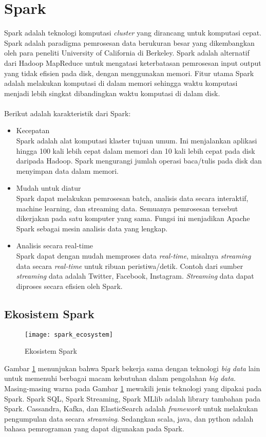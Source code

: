 \newpage
\section{Spark} 
\label{sec:konsep_spark}
Spark adalah teknologi komputasi \textit{cluster} yang dirancang untuk komputasi cepat. Spark adalah paradigma pemrosesan data berukuran besar yang dikembangkan oleh para peneliti University of California di Berkeley. Spark adalah alternatif dari Hadoop MapReduce untuk mengatasi keterbatasan pemrosesan input output yang tidak efisien pada disk, dengan menggunakan memori. Fitur utama Spark adalah melakukan komputasi di dalam memori sehingga waktu komputasi menjadi lebih singkat dibandingkan waktu komputasi di dalam disk.
\\\\
Berikut adalah karakteristik dari Spark:
\begin{itemize}
\item Kecepatan\\
Spark adalah alat komputasi klaster tujuan umum. Ini menjalankan aplikasi hingga 100 kali lebih cepat dalam memori dan 10 kali lebih cepat pada disk daripada Hadoop. Spark mengurangi jumlah operasi baca/tulis pada disk dan menyimpan data dalam memori.


\item Mudah untuk diatur\\	
Spark dapat melakukan pemrosesan batch, analisis data secara interaktif, machine learning, dan streaming data. Semuanya pemrosesan tersebut dikerjakan pada satu komputer yang sama. Fungsi ini menjadikan Apache Spark sebagai mesin analisis data yang lengkap. 


\item Analisis secara real-time\\
Spark dapat dengan mudah memproses data \textit{real-time}, misalnya \textit{streaming} data secara \textit{real-time} untuk ribuan peristiwa/detik. Contoh dari sumber \textit{streaming} data adalah Twitter, Facebook, Instagram. \textit{Streaming} data dapat diproses secara efisien oleh Spark.
\end{itemize}

\subsection{Ekosistem Spark}
\begin{figure}[H]
	\centering
	\texttt{[image: spark\_ecosystem]}
	\caption{Ekosistem Spark}
	\label{fig:spark_ecosystem}
\end{figure}
Gambar \ref{fig:spark_ecosystem} menunjukan bahwa Spark bekerja sama dengan teknologi \textit{big data} lain untuk memenuhi berbagai macam kebutuhan dalam pengolahan \textit{big data}. Masing-masing warna pada Gambar \ref{fig:spark_ecosystem} mewakili jenis teknologi yang dipakai pada Spark. Spark SQL, Spark Streaming, Spark MLlib adalah library tambahan pada Spark. Cassandra, Kafka, dan ElasticSearch adalah \textit{framework} untuk melakukan pengumpulan data secara \textit{streaming}. Sedangkan scala, java, dan python adalah bahasa pemrograman yang dapat digunakan pada Spark.


